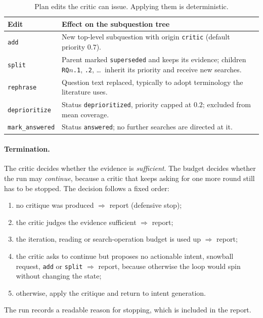 \documentclass{article}
\newcommand{\code}[1]{\texttt{#1}}
\newcommand{\headrow}{\rowcolor{tablehead}}
\newcommand{\tcol}[1]{{\bfseries\footnotesize #1}}
\begin{document}
\begin{table}[t]
\centering
\small
\caption{Plan edits the critic can issue. Applying them is deterministic.}
\label{tab:edits}
\begin{tabularx}{\linewidth}{@{}lX@{}}
\toprule
Edit & Effect on the subquestion tree \\
\midrule
\code{add}           & New top-level subquestion with origin \code{critic} (default priority $0.7$). \\
\code{split}         & Parent marked \code{superseded} and keeps its evidence; children \code{RQ}$n$\code{.1}, \code{.2}, \ldots\ inherit its priority and receive new searches. \\
\code{rephrase}      & Question text replaced, typically to adopt terminology the literature uses. \\
\code{deprioritize}  & Status \code{deprioritized}, priority capped at $0.2$; excluded from mean coverage. \\
\code{mark\_answered}& Status \code{answered}; no further searches are directed at it. \\
\bottomrule
\end{tabularx}
\end{table}

\paragraph{Termination.} The critic decides whether the evidence is
\emph{sufficient}. The budget decides whether the run may
\emph{continue}, because a critic that keeps asking for one more round
still has to be stopped. The decision follows a fixed order:
\begin{enumerate}[leftmargin=*]
  \item no critique was produced $\Rightarrow$ report (defensive stop);
  \item the critic judges the evidence sufficient $\Rightarrow$ report;
  \item the iteration, reading or search-operation budget is used up
    $\Rightarrow$ report;
  \item the critic asks to continue but proposes no actionable intent,
    snowball request, \code{add} or \code{split} $\Rightarrow$ report,
    because otherwise the loop would spin without changing the state;
  \item otherwise, apply the critique and return to intent generation.
\end{enumerate}
The run records a readable reason for stopping, which is included in the
report.
\end{document}
